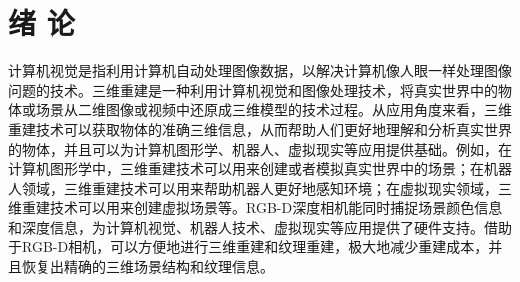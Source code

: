 \setcounter{figure}{0}
\setcounter{table}{0}
\setcounter{algocf}{0}



\chapter{绪 论}
计算机视觉是指利用计算机自动处理图像数据，以解决计算机像人眼一样处理图像问题的技术。三维重建是一种利用计算机视觉和图像处理技术，将真实世界中的物体或场景从二维图像或视频中还原成三维模型的技术过程。从应用角度来看，三维重建技术可以获取物体的准确三维信息，从而帮助人们更好地理解和分析真实世界的物体，并且可以为计算机图形学、机器人、虚拟现实等应用提供基础。例如，在计算机图形学中，三维重建技术可以用来创建或者模拟真实世界中的场景；在机器人领域，三维重建技术可以用来帮助机器人更好地感知环境；在虚拟现实领域，三维重建技术可以用来创建虚拟场景等。RGB-D深度相机能同时捕捉场景颜色信息和深度信息，为计算机视觉、机器人技术、虚拟现实等应用提供了硬件支持。借助于RGB-D相机，可以方便地进行三维重建和纹理重建，极大地减少重建成本，并且恢复出精确的三维场景结构和纹理信息。



